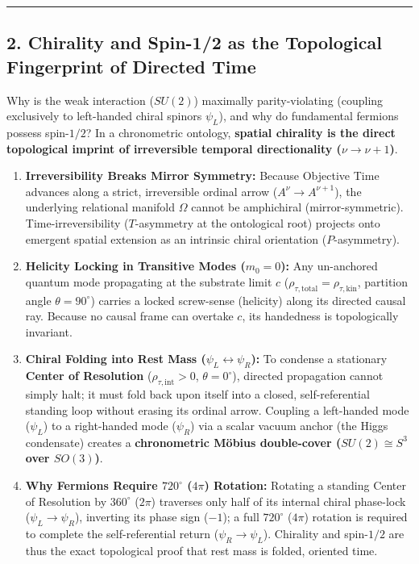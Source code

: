 \documentclass[
]{article}
\providecommand{\tightlist}{%
  \setlength{\itemsep}{0pt}\setlength{\parskip}{0pt}}
\begin{document}
\begin{center}\rule{0.5\linewidth}{0.5pt}\end{center}

\subsection{2. Chirality and Spin-1/2 as the Topological Fingerprint of
Directed
Time}\label{chirality-and-spin-12-as-the-topological-fingerprint-of-directed-time}

Why is the weak interaction (\(SU(2)\)) maximally parity-violating
(coupling exclusively to left-handed chiral spinors \(\psi_L\)), and why
do fundamental fermions possess spin-\(1/2\)? In a chronometric
ontology, \textbf{spatial chirality is the direct topological imprint of
irreversible temporal directionality (\(\nu \to \nu + 1\))}.

\begin{enumerate}
\def\labelenumi{\arabic{enumi}.}
\tightlist
\item
  \textbf{Irreversibility Breaks Mirror Symmetry:} Because Objective
  Time advances along a strict, irreversible ordinal arrow
  (\(A^\nu \to A^{\nu+1}\)), the underlying relational manifold
  \(\Omega\) cannot be amphichiral (mirror-symmetric).
  Time-irreversibility (\(T\)-asymmetry at the ontological root)
  projects onto emergent spatial extension as an intrinsic chiral
  orientation (\(P\)-asymmetry).
\item
  \textbf{Helicity Locking in Transitive Modes (\(m_0 = 0\)):} Any
  un-anchored quantum mode propagating at the substrate limit \(c\)
  (\(\rho_{\tau,\text{total}} = \rho_{\tau,\text{kin}}\), partition
  angle \(\theta = 90^\circ\)) carries a locked screw-sense (helicity)
  along its directed causal ray. Because no causal frame can overtake
  \(c\), its handedness is topologically invariant.
\item
  \textbf{Chiral Folding into Rest Mass
  (\(\psi_L \leftrightarrow \psi_R\)):} To condense a stationary
  \textbf{Center of Resolution} (\(\rho_{\tau,\text{int}} > 0\),
  \(\theta = 0^\circ\)), directed propagation cannot simply halt; it
  must fold back upon itself into a closed, self-referential standing
  loop without erasing its ordinal arrow. Coupling a left-handed mode
  (\(\psi_L\)) to a right-handed mode (\(\psi_R\)) via a scalar vacuum
  anchor (the Higgs condensate) creates a \textbf{chronometric Möbius
  double-cover (\(SU(2) \cong S^3\) over \(SO(3)\))}.
\item
  \textbf{Why Fermions Require \(720^\circ\) (\(4\pi\)) Rotation:}
  Rotating a standing Center of Resolution by \(360^\circ\) (\(2\pi\))
  traverses only half of its internal chiral phase-lock
  (\(\psi_L \to \psi_R\)), inverting its phase sign (\(-1\)); a full
  \(720^\circ\) (\(4\pi\)) rotation is required to complete the
  self-referential return (\(\psi_R \to \psi_L\)). Chirality and
  spin-\(1/2\) are thus the exact topological proof that rest mass is
  folded, oriented time.
\end{enumerate}
\end{document}
